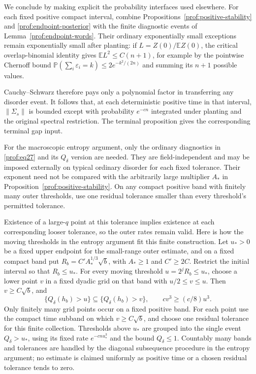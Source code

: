 We conclude by making explicit the probability interfaces used elsewhere.
For each fixed positive compact interval, combine
Propositions~\ref{prof:positive-stability} and
\ref{prof:endpoint-posterior} with the finite diagnostic events of
Lemma~\ref{prof:endpoint-words}.  Their ordinary exponentially small
exceptions remain exponentially small after planting: if
$L=Z(0)/\mathbb E Z(0)$, the critical overlap-binomial identity gives
$\mathbb E L^2\le C(n+1)$, for example by the pointwise Chernoff bound
$\mathbb P(\sum_i\varepsilon_i=k)\le2e^{-k^2/(2n)}$ and summing its
$n+1$ possible values.

Cauchy--Schwarz therefore pays only a polynomial
factor in transferring any disorder event.  It follows that, at each
deterministic positive time in that interval, $\|\Sigma_s\|$ is bounded
except with probability $e^{-cn}$ integrated under planting and the
original spectral restriction.  The terminal proposition gives the
corresponding terminal gap input.

For the macroscopic entropy argument, only the ordinary diagnostics in
\eqref{prof:eq27} and its $Q_\delta$ version are needed.  They are
field-independent and may be imposed externally on typical ordinary
disorder for each fixed tolerance.  Their exponent need not be compared
with the arbitrarily large multiplier $A_*$ in
Proposition~\ref{prof:positive-stability}.  On any compact positive
band with finitely many outer thresholds, use one residual tolerance
smaller than every threshold's permitted tolerance.

Existence of a
large-$q$ point at this tolerance implies existence at each
corresponding looser tolerance, so the outer rates remain valid.
Here is how the moving thresholds in the entropy argument fit this
finite construction. Let \(u_*>0\) be a fixed upper endpoint for
the small-range outer estimate, and on a fixed compact band put
\(R_b=C'A_*^{1/3}\sqrt b\), with \(A_*\ge1\) and \(C'\ge2C\).
Restrict the initial interval so that \(R_b\le u_*\).
For every moving threshold \(u=2^jR_b\le u_*\), choose a lower
point \(v\) in a fixed dyadic grid on that band with
\(u/2\le v\le u\). Then \(v\ge C\sqrt b\), and
\[
 \{Q_\delta(h_b)>u\}\subseteq\{Q_\delta(h_b)>v\},\qquad
 cv^3\ge(c/8)u^3.
\]
Only finitely many grid points occur on a fixed positive band.
For each point use the compact time subband on which
\(v\ge C\sqrt b\), and choose one residual tolerance for this
finite collection. Thresholds above \(u_*\) are grouped into the
single event \(Q_\delta>u_*\), using its fixed rate
\(e^{-cnu_*^3}\) and the bound \(Q_\delta\le1\).
Countably many bands and tolerances are handled by the diagonal
subsequence procedure in the entropy argument; no estimate is claimed
uniformly as positive time or a chosen residual tolerance tends to zero.
